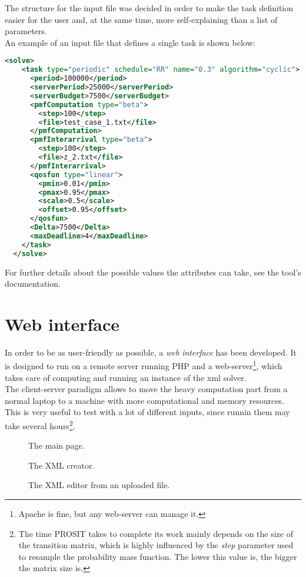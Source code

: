 The structure for the input file was decided in order to make the task definition easier for the user and, at the same time, more self-explaining than a list of parameters.\\
An example of an input file that defines a single task is shown below:
\begin{lstlisting}[frame=bt, language=XML, numbers=none]
  <solve>
    <task type="periodic" schedule="RR" name="0.3" algorithm="cyclic">
      <period>100000</period>
      <serverPeriod>25000</serverPeriod>
      <serverBudget>7500</serverBudget>
      <pmfComputation type="beta">
        <step>100</step>
        <file>test_case_1.txt</file>
      </pmfComputation>
      <pmfInterarrival type="beta">
        <step>100</step>
        <file>z_2.txt</file>
      </pmfInterarrival>
      <qosfun type="linear">
        <pmin>0.01</pmin>
        <pmax>0.95</pmax>
        <scale>0.5</scale>
        <offset>0.95</offset>
      </qosfun>
      <Delta>7500</Delta>
      <maxDeadline>4</maxDeadline>
    </task>
  </solve>
\end{lstlisting}

For further details about the possible values the attributes can take, see the tool's documentation.  

\section{Web interface}
In order to be as user-friendly as possible, a \emph{web interface} has been developed. It is designed to run on a remote server running PHP and a web-server\footnote{Apache is fine, but any web-server can manage it.}, which takes care of computing and running an instance of the xml solver.\\
The client-server paradigm allows to move the heavy computation part from a normal laptop to a machine with more computational and memory resources. This is very useful to test with a lot of different inputs, since runnin them may take several hours\footnote{The time PROSIT takes to complete its work mainly depends on the size of the transition matrix, which is highly influenced by the \emph{step} parameter used to resample the probability mass function. The lower this value is, the bigger the matrix size is.}.
\begin{figure}[H]
  \caption{The main page.}
  \label{index}
\end{figure}

\begin{figure}[H]
  \caption{The XML creator.}
  \label{modal}
\end{figure}  

\begin{figure}[H]
  \caption{The XML editor from an uploaded file.}
  \label{editor}
\end{figure}  